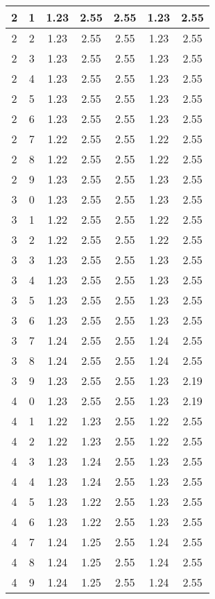 \begin{longtable}{|c|c||c||c|c||c|c|}
	2 & 1 & 1.23 & 2.55 & 2.55 & 1.23 & 2.55 \\ \hline
	2 & 2 & 1.23 & 2.55 & 2.55 & 1.23 & 2.55 \\ \hline
	2 & 3 & 1.23 & 2.55 & 2.55 & 1.23 & 2.55 \\ \hline
	2 & 4 & 1.23 & 2.55 & 2.55 & 1.23 & 2.55 \\ \hline
	2 & 5 & 1.23 & 2.55 & 2.55 & 1.23 & 2.55 \\ \hline
	2 & 6 & 1.23 & 2.55 & 2.55 & 1.23 & 2.55 \\ \hline
	2 & 7 & 1.22 & 2.55 & 2.55 & 1.22 & 2.55 \\ \hline
	2 & 8 & 1.22 & 2.55 & 2.55 & 1.22 & 2.55 \\ \hline
	2 & 9 & 1.23 & 2.55 & 2.55 & 1.23 & 2.55 \\ \hline
	3 & 0 & 1.23 & 2.55 & 2.55 & 1.23 & 2.55 \\ \hline
	3 & 1 & 1.22 & 2.55 & 2.55 & 1.22 & 2.55 \\ \hline
	3 & 2 & 1.22 & 2.55 & 2.55 & 1.22 & 2.55 \\ \hline
	3 & 3 & 1.23 & 2.55 & 2.55 & 1.23 & 2.55 \\ \hline
	3 & 4 & 1.23 & 2.55 & 2.55 & 1.23 & 2.55 \\ \hline
	3 & 5 & 1.23 & 2.55 & 2.55 & 1.23 & 2.55 \\ \hline
	3 & 6 & 1.23 & 2.55 & 2.55 & 1.23 & 2.55 \\ \hline
	3 & 7 & 1.24 & 2.55 & 2.55 & 1.24 & 2.55 \\ \hline
	3 & 8 & 1.24 & 2.55 & 2.55 & 1.24 & 2.55 \\ \hline
	3 & 9 & 1.23 & 2.55 & 2.55 & 1.23 & 2.19 \\ \hline
	4 & 0 & 1.23 & 2.55 & 2.55 & 1.23 & 2.19 \\ \hline
	4 & 1 & 1.22 & 1.23 & 2.55 & 1.22 & 2.55 \\ \hline
	4 & 2 & 1.22 & 1.23 & 2.55 & 1.22 & 2.55 \\ \hline
	4 & 3 & 1.23 & 1.24 & 2.55 & 1.23 & 2.55 \\ \hline
	4 & 4 & 1.23 & 1.24 & 2.55 & 1.23 & 2.55 \\ \hline
	4 & 5 & 1.23 & 1.22 & 2.55 & 1.23 & 2.55 \\ \hline
	4 & 6 & 1.23 & 1.22 & 2.55 & 1.23 & 2.55 \\ \hline
	4 & 7 & 1.24 & 1.25 & 2.55 & 1.24 & 2.55 \\ \hline
	4 & 8 & 1.24 & 1.25 & 2.55 & 1.24 & 2.55 \\ \hline
	4 & 9 & 1.24 & 1.25 & 2.55 & 1.24 & 2.55 \\ \hline

\end{longtable}
